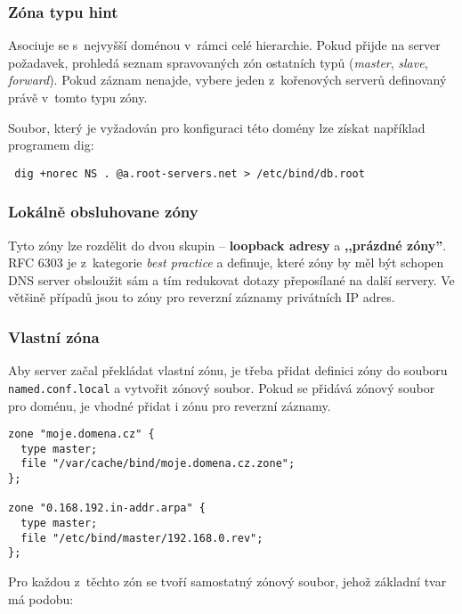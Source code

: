 \subsubsection{Zóna typu hint}
Asociuje se s~nejvyšší doménou v~rámci celé hierarchie. Pokud přijde na server požadavek, prohledá seznam spravovaných zón ostatních typů ({\em master}, {\em slave}, {\em forward}). Pokud záznam nenajde, vybere jeden z~kořenových serverů definovaný právě v~tomto typu zóny.

Soubor, který je vyžadován pro konfiguraci této domény lze získat například programem dig:
\begin{verbatim}
 dig +norec NS . @a.root-servers.net > /etc/bind/db.root
\end{verbatim}

\subsubsection{Lokálně obsluhovane zóny}
Tyto zóny lze rozdělit do dvou skupin -- {\bf loopback adresy} a {\bf ,,prázdné zóny''}. RFC 6303
\cite{rfc6303} je z~kategorie {\em best practice} a definuje, které zóny by měl být schopen DNS server
obsloužit sám a tím redukovat dotazy přeposílané na další servery. Ve většině případů jsou to zóny pro reverzní záznamy privátních IP adres.


\subsubsection{Vlastní zóna}
Aby server začal překládat vlastní zónu, je třeba přidat definici zóny do souboru {\tt named.conf.local} a vytvořit zónový soubor. Pokud se přidává zónový soubor pro doménu, je vhodné přidat i zónu pro reverzní záznamy.

\begin{verbatim}
zone "moje.domena.cz" {
  type master;
  file "/var/cache/bind/moje.domena.cz.zone";
};

zone "0.168.192.in-addr.arpa" {
  type master;
  file "/etc/bind/master/192.168.0.rev";
};
\end{verbatim}

Pro každou z~těchto zón se tvoří samostatný zónový soubor, jehož základní tvar má podobu:

